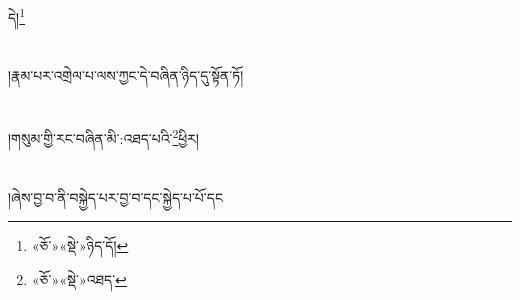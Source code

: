 དེ།\footnote{«ཅོ་»«སྡེ་»ཉིད་དོ།}\chapter{ }།རྣམ་པར་འགྲེལ་པ་ལས་ཀྱང་དེ་བཞིན་ཉིད་དུ་སྟོན་ཏོ།\chapter{ }།གསུམ་གྱི་རང་བཞིན་མི་:འཐད་པའི་\footnote{«ཅོ་»«སྡེ་»འཐད་}ཕྱིར།\chapter{ }།ཞེས་བྱ་བ་ནི་བསྐྱེད་པར་བྱ་བ་དང་སྐྱེད་པ་པོ་དང